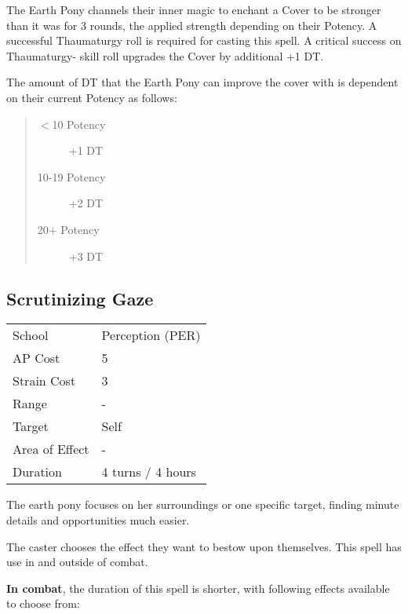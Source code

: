 \documentclass[11pt,a4paper,twocolumn]{book}
\begin{document}
The Earth Pony channels their inner magic to enchant a Cover to be stronger than it was for 3 rounds, the applied strength depending on their Potency. A successful Thaumaturgy roll is required for casting this spell. A critical success on Thaumaturgy- skill roll upgrades the Cover by additional +1 DT.

The amount of DT that the Earth Pony can improve the cover with is dependent on their current Potency as follows:

\begin{quote}
	\begin{description}
		\item[$<$10 Potency] 	+1 DT
		\item[10-19 Potency] 	+2 DT
		\item[20+ Potency] 	+3 DT
	\end{description}
\end{quote}


\subsection*{Scrutinizing Gaze}
{
	\begin{tabu} to 75mm{| X[l,4] | X[l,7] |}
		\hline
		School 			& Perception (PER) 	\\
		AP Cost	      	& 5 				\\
		Strain Cost     & 3 				\\
		Range     		& - 	\\
		Target      	& Self				\\
		Area of Effect  & - 	 		\\
		Duration     	& 4 turns / 4 hours 				\\ \hline
	\end{tabu}
	
}

\medskip

The earth pony focuses on her surroundings or one specific target, finding minute details and opportunities much easier.

The caster chooses the effect they want to bestow upon themselves. This spell has use in and outside of combat.

\medskip

\textbf{In combat}, the duration of this spell is shorter, with following effects available to choose from:
\end{document}
